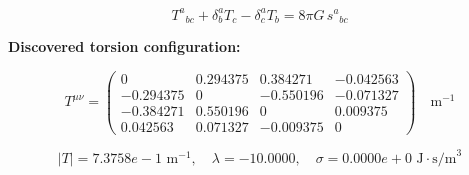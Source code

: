 
\begin{equation}
  T^a{}_{bc} + \delta^a_b T_c - \delta^a_c T_b = 8\pi G \, s^a{}_{bc}
\end{equation}

\textbf{Discovered torsion configuration:}

\begin{equation}
  T^{\mu\nu} = \begin{pmatrix}
    0 & 0.294375 & 0.384271 & -0.042563 \\
    -0.294375 & 0 & -0.550196 & -0.071327 \\
    -0.384271 & 0.550196 & 0 & 0.009375 \\
    0.042563 & 0.071327 & -0.009375 & 0
  \end{pmatrix} \quad \text{m}^{-1}
\end{equation}

\begin{equation}
  |T| = 7.3758e-1 \text{ m}^{-1}, \quad
  \lambda = -10.0000, \quad
  \sigma = 0.0000e+0 \text{ J}\cdot\text{s/m}^3
\end{equation}